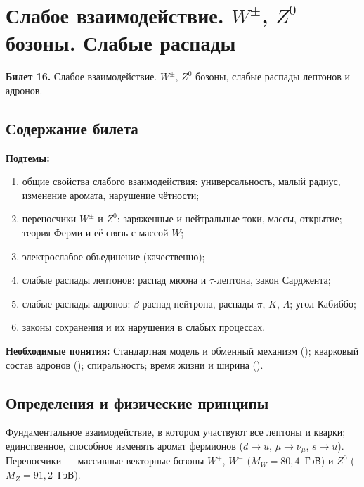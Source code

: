 \chapter[Слабое взаимодействие. \texorpdfstring{$W^\pm$, $Z^0$}{W±, Z0} бозоны. Слабые распады]%
        {Слабое взаимодействие. \texorpdfstring{$W^\pm$, $Z^0$}{W±, Z0} бозоны. Слабые распады}
\label{t:16}

\begin{qbox}
\textbf{Билет 16.} Слабое взаимодействие. $W^\pm$, $Z^0$ бозоны, слабые распады лептонов и адронов.
\end{qbox}

\section{Содержание билета}

\textbf{Подтемы:}
\begin{enumerate}
 \item общие свойства слабого взаимодействия: универсальность, малый радиус, изменение аромата, нарушение чётности;
 \item переносчики $W^\pm$ и $Z^0$: заряженные и нейтральные токи, массы, открытие; теория Ферми и её связь с массой $W$;
 \item электрослабое объединение (качественно);
 \item слабые распады лептонов: распад мюона и $\tau$-лептона, закон Сарджента;
 \item слабые распады адронов: $\beta$-распад нейтрона, распады $\pi$, $K$, $\Lambda$; угол Кабиббо;
 \item законы сохранения и их нарушения в слабых процессах.
\end{enumerate}

\textbf{Необходимые понятия:} Стандартная модель и обменный механизм (); кварковый состав
адронов (); спиральность; время жизни и ширина ().

\section{Определения и физические принципы}

\begin{definition}
Фундаментальное взаимодействие, в котором участвуют все лептоны и кварки; единственное, способное
изменять аромат фермионов ($d\to u$, $\mu\to\nu_\mu$, $s\to u$). Переносчики — массивные векторные бозоны $W^+$, $W^-$
($M_W=80{,}4$~ГэВ) и $Z^0$ ($M_Z=91{,}2$~ГэВ).
\end{definition}

